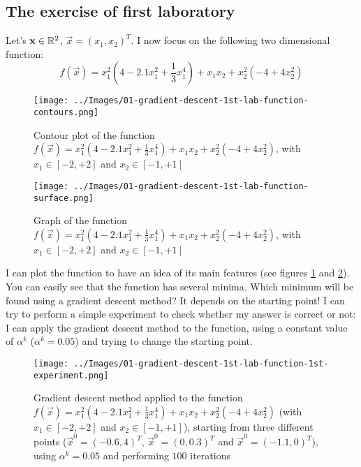     \subsection{The exercise of first laboratory}
        Let's \(\mathbf{x} \in \mathbb{R}^2\), \(\vec{x} = (x_1, x_2)^T\). I now focus on the following two dimensional function:
        \[f(\vec{x}) = x_1^2(4 - 2.1x_1^2 + \frac{1}{3}x_1^4) + x_1x_2 + x_2^2(-4 + 4x_2^2)\]
        \begin{figure}
            \centering
            \texttt{[image: ../Images/01-gradient-descent-1st-lab-function-contours.png]}
            \caption{Contour plot of the function \(f(\vec{x}) = x_1^2(4 - 2.1x_1^2 + \frac{1}{3}x_1^4) + x_1x_2 + x_2^2(-4 + 4x_2^2)\), with \(x_1 \in [-2, +2]\) and \(x_2 \in [-1, +1]\)}
            \label{gradient-descent-1st-lab-function-contours}
        \end{figure}
        \begin{figure}
            \centering
            \texttt{[image: ../Images/01-gradient-descent-1st-lab-function-surface.png]}
            \caption{Graph of the function \(f(\vec{x}) = x_1^2(4 - 2.1x_1^2 + \frac{1}{3}x_1^4) + x_1x_2 + x_2^2(-4 + 4x_2^2)\), with \(x_1 \in [-2, +2]\) and \(x_2 \in [-1, +1]\)}
            \label{gradient-descent-1st-lab-function-surface}
        \end{figure}
        I can plot the function to have an idea of its main features (see figures \ref{gradient-descent-1st-lab-function-contours} and \ref{gradient-descent-1st-lab-function-surface}). You can easily see that the function has several minima. Which minimum will be found using a gradient descent method? It depends on the starting point! I can try to perform a simple experiment to check whether my answer is correct or not: I can apply the gradient descent method to the function, using a constant value of \(\alpha^k\) (\(\alpha^k = 0.05\)) and trying to change the starting point.
        \begin{figure}
            \centering
            \texttt{[image: ../Images/01-gradient-descent-1st-lab-function-1st-experiment.png]}
            \caption{Gradient descent method applied to the function \(f(\vec{x}) = x_1^2(4 - 2.1x_1^2 + \frac{1}{3}x_1^4) + x_1x_2 + x_2^2(-4 + 4x_2^2)\) (with \(x_1 \in [-2, +2]\) and \(x_2 \in [-1, +1]\)), starting from three different points (\(\vec{x}^0 = (-0.6,4)^T\), \(\vec{x}^0 = (0,0.3)^T\) and \(\vec{x}^0 = (-1.1,0)^T\)), using \(\alpha^k = 0.05\) and performing \(100\) iterations}
            \label{gradient-descent-1st-lab-function-1st-experiment}
        \end{figure}
